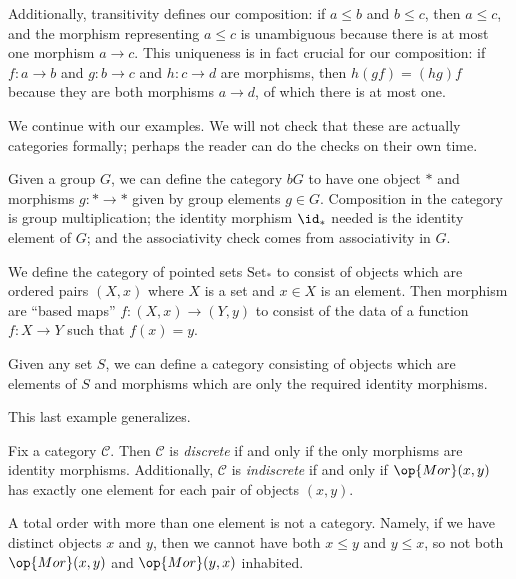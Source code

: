 Additionally, transitivity defines our composition: if $a\le b$ and $b\le c$, then $a\le c$, and the morphism representing $a\le c$ is unambiguous because there is at most one morphism $a\to c$. This uniqueness is in fact crucial for our composition: if $f:a\to b$ and $g:b\to c$ and $h:c\to d$ are morphisms, then $h(gf)=(hg)f$ because they are both morphisms $a\to d$, of which there is at most one.

We continue with our examples. We will not check that these are actually categories formally; perhaps the reader can do the checks on their own time.
\begin{example}[Groups]
	Given a group $G$, we can define the category $bG$ to have one object $*$ and morphisms $g:*\to*$ given by group elements $g\in G$. Composition in the category is group multiplication; the identity morphism $\id_*$ needed is the identity element of $G$; and the associativity check comes from associativity in $G$.
\end{example}
\begin{example}
	We define the category of pointed sets $\mathrm{Set}_*$ to consist of objects which are ordered pairs $(X,x)$ where $X$ is a set and $x\in X$ is an element. Then morphism are ``based maps'' $f:(X,x)\to(Y,y)$ to consist of the data of a function $f:X\to Y$ such that $f(x)=y$.
\end{example}
\begin{example}
	Given any set $S$, we can define a category consisting of objects which are elements of $S$ and morphisms which are only the required identity morphisms.
\end{example}
This last example generalizes.
\begin{definition}
	Fix a category $\mathcal C$. Then $\mathcal C$ is \textit{discrete} if and only if the only morphisms are identity morphisms. Additionally, $\mathcal C$ is \textit{indiscrete} if and only if $\op{Mor}(x,y)$ has exactly one element for each pair of objects $(x,y)$.
\end{definition}
\begin{warn}
	A total order with more than one element is not a category. Namely, if we have distinct objects $x$ and $y$, then we cannot have both $x\le y$ and $y\le x$, so not both $\op{Mor}(x,y)$ and $\op{Mor}(y,x)$ inhabited.
\end{warn}


